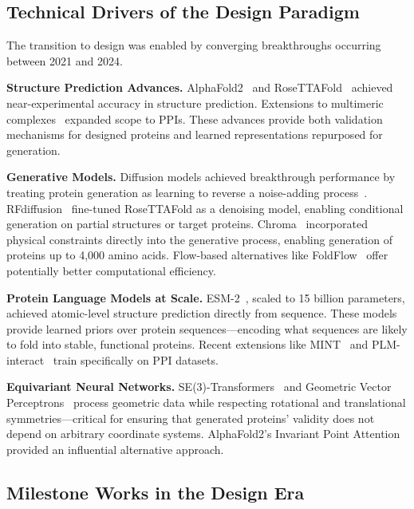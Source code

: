 \subsection{Technical Drivers of the Design Paradigm}

The transition to design was enabled by converging breakthroughs occurring between 2021 and 2024.

\textbf{Structure Prediction Advances.} AlphaFold2~\cite{jumper2021alphafold} and RoseTTAFold~\cite{baek2021rosettafold} achieved near-experimental accuracy in structure prediction. Extensions to multimeric complexes~\cite{evans2022alphafoldmultimer,baek2023rosettafold2} expanded scope to PPIs. These advances provide both validation mechanisms for designed proteins and learned representations repurposed for generation.

\textbf{Generative Models.} Diffusion models achieved breakthrough performance by treating protein generation as learning to reverse a noise-adding process~\cite{ho2020denoising}. RFdiffusion~\cite{watson2023rfdiffusion} fine-tuned RoseTTAFold as a denoising model, enabling conditional generation on partial structures or target proteins. Chroma~\cite{ingraham2023chroma} incorporated physical constraints directly into the generative process, enabling generation of proteins up to 4,000 amino acids. Flow-based alternatives like FoldFlow~\cite{bose2023foldflow} offer potentially better computational efficiency.

\textbf{Protein Language Models at Scale.} ESM-2~\cite{lin2023esm2}, scaled to 15 billion parameters, achieved atomic-level structure prediction directly from sequence. These models provide learned priors over protein sequences---encoding what sequences are likely to fold into stable, functional proteins. Recent extensions like MINT~\cite{ullanat2025mint} and PLM-interact~\cite{zhao2025plminteract} train specifically on PPI datasets.

\textbf{Equivariant Neural Networks.} SE(3)-Transformers~\cite{fuchs2020se3transformer} and Geometric Vector Perceptrons~\cite{jing2021gvp} process geometric data while respecting rotational and translational symmetries---critical for ensuring that generated proteins' validity does not depend on arbitrary coordinate systems. AlphaFold2's Invariant Point Attention~\cite{jumper2021alphafold} provided an influential alternative approach.

\subsection{Milestone Works in the Design Era}

